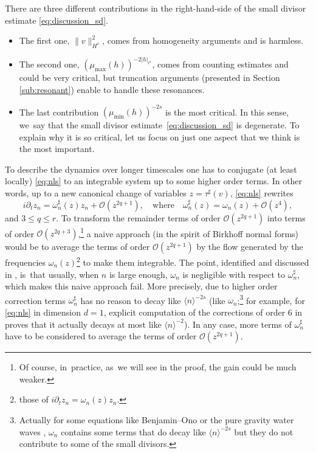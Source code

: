 \documentclass[JEP,XML,SOM,Unicode,published]{cedram}
\theoremstyle{plain}
\theoremstyle{definition}
\newcommand{\1}{\mathbf{1}}
\begin{document}
There are three different contributions in the right-hand-side of the small divisor estimate \eqref{eq:discussion_sd}.
\begin{itemize}
\item The first one, $\| v\|_{H^s}^2$, comes from homogeneity arguments and is harmless.
\item The second one, $(\mu_{\max}(h))^{-2|h|_{\ell^1}}$, comes from counting estimates and could be very critical, but truncation arguments (presented in Section \ref{sub:resonant}) enable to handle these resonances.
\item The last contribution $(\mu_{\min}(h))^{-2s}$ is the most critical. In this sense, we~say that the small divisor estimate~\eqref{eq:discussion_sd} is degenerate. To explain why it is so critical, let us focus on just one aspect that we think is the most important.
\end{itemize}

To describe the dynamics over longer timescales one has to conjugate (at least locally) \eqref{eq:nls} to an integrable system up to some higher order terms. In other words, up to a new canonical change of variables $z = \tau^\sharp(v)$, \eqref{eq:nls} rewrites
\[
i\partial_t z_n = \omega_n^\sharp(z) z_n + \mathcal{O}(z^{2q+1}), \quad \mathrm{where} \quad \omega_n^\sharp(z) = \omega_n(z) + \mathcal{O}(z^4),
\]
and $3\leq q \leq r$. To transform the remainder terms of order $\mathcal{O}(z^{2q+1})$ into terms of order $\mathcal{O}(z^{2q+3})$,\footnote{Of course, in~practice, as~we will see in the proof, the gain could be much weaker.} a naive approach (in the spirit of Birkhoff normal forms) would be to average the terms of order $\mathcal{O}(z^{2q+1})$ by the flow generated by the frequencies $\omega_n(z)$\footnote{\ie those of $i\partial_t z_n = \omega_n(z) z_n$.} to make them integrable. The point, identified and discussed in \cite{KillBill}, is~that usually, when $n$ is large enough, $\omega_n$ is negligible with respect to $\omega_n^\sharp$, which makes this naive approach fail. More precisely, due to higher order correction terms $\omega_n^\sharp$ has no reason to decay like $\langle n \rangle^{-2s}$ (\ie like $\omega_n$;\footnote{Actually for some equations like Benjamin--Ono \cite{KtA} or the pure gravity water waves \cite{BFP23}, $\omega_n$ contains some terms that do decay like $\langle n \rangle^{-2s}$ but they do not contribute to some of the small divisors.} for example, for \eqref{eq:nls} in dimension $d=1$, explicit computation of the corrections of order 6 in \cite{KillBill} proves that it actually decays at most like $\langle n \rangle^{-2}$). In any case, more terms of $\omega_n^\sharp$ have to be considered to average the terms of order $\mathcal{O}(z^{2q+1})$.
\end{document}

